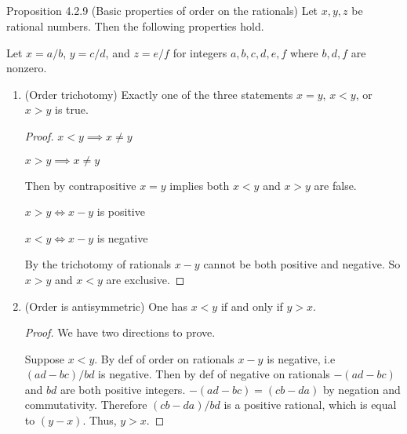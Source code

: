 \documentclass[../../main.tex]{subfiles}
\begin{document}
\addtocounter{subsection}{1}
\subsection{}
\begin{q}
    Proposition 4.2.9 (Basic properties of order on the rationals) Let $x, y,z$ be rational
numbers. Then the following properties hold.
\end{q}

Let $x = a/b$, $y = c/d$, and $z = e/f$ for integers $a, b, c, d, e, f$ where $b, d, f$ are nonzero.
\begin{enumerate}
    \item
    \begin{q}
         (Order trichotomy) Exactly one of the three statements $x = y$, $x < y$, or $x > y$ is true.
    \end{q}
    \begin{proof}
        $x < y \implies x \neq y$

        $x > y \implies x \neq y$

        Then by contrapositive $x = y$ implies both $x < y$ and $x > y$ are false.

        $x > y \iff x-y$ is positive

        $x < y \iff x-y$ is negative

        By the trichotomy of rationals $x-y$ cannot be both positive and negative. So $x > y$ and $x < y$ are exclusive.
    \end{proof}
    \item 
    \begin{q}
        (Order is antisymmetric) One has $x < y$ if and only if $y > x$.
    \end{q}
    \begin{proof}
        We have two directions to prove.

        Suppose $x < y$. 
        By def of order on rationals $x-y$ is negative, i.e 
        $(ad - bc) / bd$ is negative.
        Then by def of negative on rationals $-(ad - bc)$ and $bd$ are both positive integers.
        $-(ad - bc) = (cb - da)$ by negation and commutativity.
        Therefore $(cb - da) / bd$ is a positive rational, which is equal to $(y-x)$.
        Thus, $y > x$.


\end{proof}
\end{enumerate}
\end{document}
